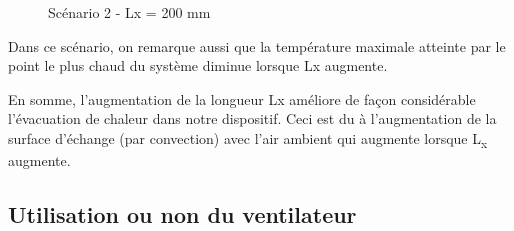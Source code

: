 \documentclass[11pt]{article} %
\begin{document}
\begin{figure}[!htb]
				\centering
				\qquad
				\caption{Scénario 2 - Lx = 200 mm}%
			\end{figure}
\par Dans ce scénario, on remarque aussi que la température maximale atteinte par le point le plus chaud du système diminue lorsque Lx augmente. \\
\par En somme, l’augmentation de la longueur Lx améliore de façon considérable l’évacuation de chaleur dans notre dispositif. Ceci est du à l’augmentation de la surface d’échange (par convection) avec l’air ambient qui augmente lorsque L\textsubscript x augmente.
	\subsection{Utilisation ou non du ventilateur}
\end{document}
